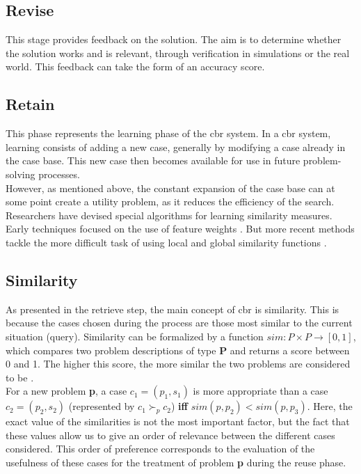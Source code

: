     \subsection{Revise}
    This stage provides feedback on the solution. The aim is to determine whether the solution works and is relevant, through verification in simulations or the real world. This feedback can take the form of an accuracy score.
    
    
    \subsection{Retain}
    This phase represents the learning phase of the \acrshort{cbr} system. In a \acrshort{cbr} system, learning consists of adding a new case, generally by modifying a case already in the case base. This new case then becomes available for use in future problem-solving processes.\\
    However, as mentioned above, the constant expansion of the case base can at some point create a utility problem, as it reduces the efficiency of the search. Researchers have devised special algorithms for learning similarity measures. Early techniques focused on the use of feature weights \cite{cbrIntroRecent}. But more recent methods tackle the more difficult task of using local and global similarity functions \cite{shaheen2020novel, jaiswal2022f}. 

    
    
    \subsection{Similarity\label{subsec:similarity}}
    As presented in the retrieve step, the main concept of \acrshort{cbr} is similarity. This is because the cases chosen during the process are those most similar to the current situation (query). Similarity can be formalized by a function $sim: P \times P \rightarrow [0, 1]$, which compares two problem descriptions of type \textbf{P} and returns a score between 0 and 1. The higher this score, the more similar the two problems are considered to be \cite{cbrIntroRecent}.\\
    For a new problem \textbf{p}, a case $c_1 = (p_1, s_1)$ is more appropriate than a case $c_2 = (p_2, s_2)$ (represented by $c_1 \succ_p c_2$) \textbf{iff} $sim(p, p_2) < sim(p, p_3)$. Here, the exact value of the similarities is not the most important factor, but the fact that these values allow us to give an order of relevance between the different cases considered. This order of preference corresponds to the evaluation of the usefulness of these cases for the treatment of problem \textbf{p} during the reuse phase.\\
    
